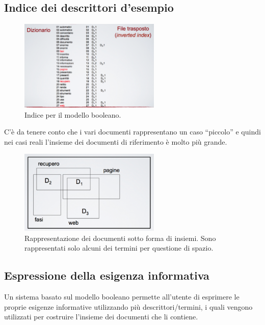 \subsection{Indice dei descrittori d'esempio}

\begin{figure}[htbp]
	\centering
	\includegraphics[width=0.6\textwidth]{./images/l7-index-bool}
	\caption{Indice per il modello booleano.}
\end{figure}

C'è da tenere conto che i vari documenti rappresentano un caso ``piccolo'' e quindi nei casi reali l'insieme dei documenti di riferimento è molto più grande.

\begin{figure}[htbp]
	\centering
	\includegraphics[width=0.6\textwidth]{./images/l7-insieme}
	\caption{Rappresentazione dei documenti sotto forma di insiemi. Sono rappresentati solo alcuni dei termini per questione di spazio.}
\end{figure}

\subsection{Espressione della esigenza informativa}

Un sistema basato sul modello booleano permette all'utente di esprimere le proprie esigenze informative utilizzando più descrittori/termini, i quali vengono utilizzati per costruire l'insieme dei documenti che li contiene.


